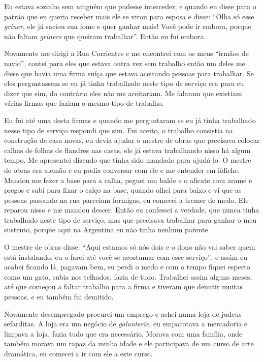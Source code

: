 Eu estava sozinho sem ninguém que pudesse interceder, e quando eu disse
para o patrão que eu queria receber mais ele se virou para esposa e
disse: ``Olha só esse \textit{griner}, ele já saciou sua fome e quer
ganhar mais! Você pode ir embora, porque não faltam \textit{griners} que
queiram trabalhar''. Então eu fui embora.

Novamente me dirigi a Rua Corrientes e me encontrei com os meus ``irmãos
de navio'', contei para eles que estava outra vez sem trabalho então um
deles me disse que havia uma firma suíça que estava aceitando pessoas
para trabalhar. Se eles perguntassem se eu já tinha trabalhado neste
tipo de serviço era para eu dizer que sim, do contrário eles não me
aceitariam. Me falaram que existiam várias firmas que faziam o mesmo
tipo de trabalho.

Eu fui até uma desta firmas e quando me perguntaram se eu já tinha
trabalhado nesse tipo de serviço respondi que sim. Fui aceito, o
trabalho consistia na construção de casa novas, eu devia ajudar o mestre
de obras que precisava colocar calhas de folhas de flandres nas casas,
ele já estava trabalhando nisso há algum tempo. Me apresentei dizendo
que tinha sido mandado para ajudá-lo. O mestre de obras era alemão e eu
podia conversar com ele e me entender em iídiche. Mandou me fazer a base
para a calha, peguei um balde e o alicate com arame e pregos e subi para
fixar o calço na base, quando olhei para baixo e vi que as pessoas
passando na rua pareciam formigas, eu comecei a tremer de medo. Ele
reparou nisso e me mandou descer. Então eu confessei a verdade, que
nunca tinha trabalhado neste tipo de serviço, mas que precisava
trabalhar para ganhar o meu sustento, porque aqui na Argentina eu não
tinha nenhum parente.

O mestre de obras disse: ``Aqui estamos só nós dois e o dono não vai
saber quem está instalando, eu o farei até você se acostumar com esse
serviço'', e assim eu acabei ficando lá, pagavam bem, eu perdi o medo e
com o tempo fiquei esperto como um gato, subia nos telhados, fazia de
tudo. Trabalhei assim alguns meses, até que começou a faltar trabalho
para a firma e tiveram que demitir muitas pessoas, e eu também fui
demitido.

Novamente desempregado procurei um emprego e achei numa loja de judeus
sefarditas. A loja era um negócio de \textit{galanterie}, eu empacotava a
mercadoria e limpava a loja, fazia tudo que era necessário. Morava com
uma família, onde também morava um rapaz da minha idade e ele
participava de um curso de arte dramática, eu comecei a ir com ele a
este curso.

